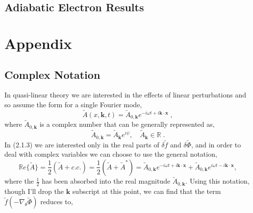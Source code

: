 \documentclass[12pt]{article}
\numberwithin{equation}{subsection}
\begin{document}
\subsection{Adiabatic Electron Results}


\newpage{}

\appendix

\section*{Appendix}
\renewcommand{\thesubsection}{\Alph{subsection}}

\subsection{Complex Notation}
   \quad In quasi-linear theory we are interested in the effects of linear perturbations and so assume the form for a single Fourier mode,   
   \begin{equation}
      \widetilde{A}(x,\bm{k},t) = \widetilde{A}_{0,\bm{k}}e^{-i\omega t + i\bm{k}\cdot\bm{x}}\;,
   \end{equation}
where $\widetilde{A}_{0,\bm{k}}$ is a complex number that can be generally represented as,
   \begin{equation}
      \widetilde{A}_{0,\bm{k}} = \widetilde{A}_{\bm{k}}e^{i\psi},\quad \widetilde{A}_{\bm{k}}\in\mathbb{R}\;.
   \end{equation}
In (2.1.3) we are interested only in the real parts of $\delta\widetilde{f}$ and $\delta\widetilde{\Phi}$,
and in order to deal with complex variables we can choose to use the general notation,
   \begin{equation}
      \mathbb{R}e\{\widetilde{A}\} = \frac{1}{2}(\widetilde{A} + c.c.) = \frac{1}{2}(\widetilde{A} + \widetilde{A}^*)
                                   =   \widetilde{A}_{0,\bm{k}}e^{-i\omega t + i\bm{k}\cdot\bm{x}}
                                     + \widetilde{A}_{0,\bm{k}}e^{i\omega t -i\bm{k}\cdot\bm{x}},
   \end{equation}
where the $\frac{1}{2}$ has been absorbed into the real magnitude $\widetilde{A}_{0,\bm{k}}$. Using this notation, though I'll drop the $\bm{k}$ subscript
at this point, we can find that the term $\widetilde{f}(-\nabla_{\theta}\widetilde{\Phi})$ reduces to,
\end{document}
